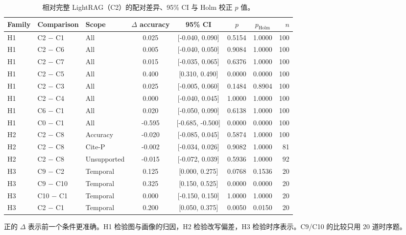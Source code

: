 \begin{table}[H]
\centering
\caption{相对完整 LightRAG（C2）的配对差异、95\% CI 与 Holm 校正 $p$ 值。}
\label{tab:paired}
\scriptsize
\setlength{\tabcolsep}{3.0pt}
\begin{threeparttable}
\begin{tabular}{@{}l l l c c c c r@{}}
\toprule
Family & Comparison & Scope & $\Delta$ accuracy & 95\% CI & $p$ & $p_{\mathrm{Holm}}$ & $n$ \\
\midrule
H1 & C2 $-$ C1 & All & 0.025 & [-0.040, 0.090] & 0.5154 & 1.0000 & 100 \\
H1 & C2 $-$ C6 & All & 0.005 & [-0.040, 0.050] & 0.9084 & 1.0000 & 100 \\
H1 & C2 $-$ C7 & All & 0.015 & [-0.035, 0.065] & 0.6376 & 1.0000 & 100 \\
H1 & C2 $-$ C5 & All & 0.400 & [0.310, 0.490] & 0.0000 & 0.0000 & 100 \\
H1 & C2 $-$ C3 & All & 0.025 & [-0.005, 0.060] & 0.1484 & 0.8904 & 100 \\
H1 & C2 $-$ C4 & All & 0.000 & [-0.040, 0.045] & 1.0000 & 1.0000 & 100 \\
H1 & C6 $-$ C1 & All & 0.020 & [-0.050, 0.090] & 0.6138 & 1.0000 & 100 \\
H1 & C0 $-$ C1 & All & -0.595 & [-0.685, -0.500] & 0.0000 & 0.0000 & 100 \\
H2 & C2 $-$ C8 & Accuracy & -0.020 & [-0.085, 0.045] & 0.5874 & 1.0000 & 100 \\
H2 & C2 $-$ C8 & Cite-P & -0.002 & [-0.034, 0.026] & 0.9082 & 1.0000 & 81 \\
H2 & C2 $-$ C8 & Unsupported & -0.015 & [-0.072, 0.039] & 0.5936 & 1.0000 & 92 \\
H3 & C9 $-$ C2 & Temporal & 0.125 & [0.000, 0.275] & 0.0768 & 0.1536 & 20 \\
H3 & C9 $-$ C10 & Temporal & 0.325 & [0.150, 0.525] & 0.0000 & 0.0000 & 20 \\
H3 & C10 $-$ C1 & Temporal & 0.000 & [-0.150, 0.150] & 1.0000 & 1.0000 & 20 \\
H3 & C2 $-$ C1 & Temporal & 0.200 & [0.050, 0.375] & 0.0050 & 0.0150 & 20 \\
\bottomrule
\end{tabular}
\begin{tablenotes}\scriptsize
\item 正的 $\Delta$ 表示前一个条件更准确。H1 检验图与画像的归因，H2 检验改写偏差，H3 检验时序表示。C9/C10 的比较只用 20 道时序题。
\end{tablenotes}
\end{threeparttable}
\end{table}
